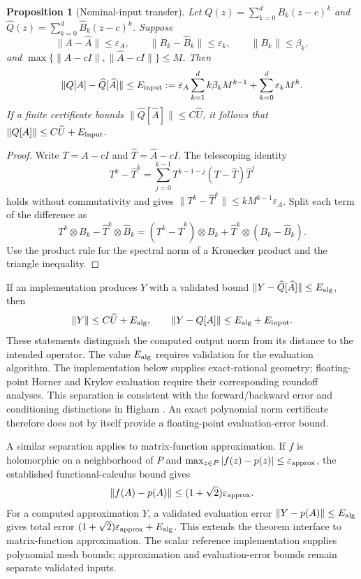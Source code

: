 \documentclass[11pt]{article}
\newcommand{\norm}[1]{\lVert #1\rVert}
\newcommand{\cbase}{1+\sqrt{2}}
\newtheorem{proposition}[theorem]{Proposition}
\theoremstyle{definition}
\theoremstyle{remark}
\numberwithin{equation}{section}
\begin{document}
\begin{proposition}[Nominal-input transfer]\label{prop:perturbation}
Let
\(Q(z)=\sum_{k=0}^d B_k(z-c)^k\) and
\(\widehat Q(z)=\sum_{k=0}^d\widehat B_k(z-c)^k\).
Suppose
\[
 \norm{A-\widehat A}\le\varepsilon_A,\qquad
 \norm{B_k-\widehat B_k}\le\varepsilon_k,\qquad
 \norm{B_k}\le\beta_k,
\]
and
\(\max\{\norm{A-cI},\norm{\widehat A-cI}\}\le M\).
Then
\begin{equation}\label{eq:perturbation}
 \norm{Q[A]-\widehat Q[\widehat A]}
 \le E_{\rm input}
 :=\varepsilon_A\sum_{k=1}^d k\beta_k M^{k-1}
   +\sum_{k=0}^d\varepsilon_k M^k.
\end{equation}
If a finite certificate bounds
\(\norm{\widehat Q[\widehat A]}\le C\widehat U\), it follows that
\(\norm{Q[A]}\le C\widehat U+E_{\rm input}\).
\end{proposition}
\begin{proof}
Write \(T=A-cI\) and \(\widehat T=\widehat A-cI\).
The telescoping identity
\[
 T^k-\widehat T^k
 =\sum_{j=0}^{k-1}T^{k-1-j}(T-\widehat T)\widehat T^j
\]
holds without commutativity and gives
\(\norm{T^k-\widehat T^k}\le kM^{k-1}\varepsilon_A\).
Split each term of the difference as
\[
 T^k\otimes B_k-\widehat T^k\otimes\widehat B_k
 =(T^k-\widehat T^k)\otimes B_k
   +\widehat T^k\otimes(B_k-\widehat B_k).
\]
Use the product rule for the spectral norm of a Kronecker product and
the triangle inequality.
\end{proof}

If an implementation produces \(Y\) with a validated bound
\(\norm{Y-\widehat Q[\widehat A]}\le E_{\rm alg}\), then
\[
 \norm{Y}\le C\widehat U+E_{\rm alg},\qquad
 \norm{Y-Q[A]}\le E_{\rm alg}+E_{\rm input}.
\]
These statements distinguish the computed output norm from its distance to
the intended operator.
The value \(E_{\rm alg}\) requires validation for the evaluation algorithm.
The implementation below supplies exact-rational geometry; floating-point
Horner and Krylov evaluation require their corresponding roundoff analyses.
This separation is consistent with the forward/backward error and
conditioning distinctions in Higham \citep[Chapters~1--3 and~5]{Higham2002}.
An exact polynomial norm certificate therefore does not by itself
provide a floating-point evaluation-error bound.


A similar separation applies to matrix-function approximation.
If \(f\) is holomorphic on a neighborhood of \(P\) and
\(\max_{z\in P}|f(z)-p(z)|\le\varepsilon_{\rm approx}\), the established
functional-calculus bound gives
\[
 \norm{f(A)-p(A)}\le(\cbase)\varepsilon_{\rm approx}.
\]
For a computed approximation \(Y\), a validated evaluation error
\(\norm{Y-p(A)}\le E_{\rm alg}\) gives total error
\((\cbase)\varepsilon_{\rm approx}+E_{\rm alg}\).
This extends the theorem interface to matrix-function approximation.
The scalar reference implementation supplies polynomial mesh bounds;
approximation and evaluation-error bounds remain separate validated inputs.
\end{document}
